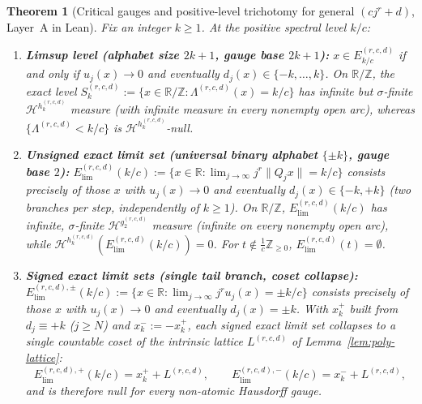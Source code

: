 \documentclass[11pt]{article}
\newtheorem{theorem}{Theorem}
\theoremstyle{definition}
\theoremstyle{remark}
\newcommand{\R}{\mathbb{R}}
\newcommand{\Z}{\mathbb{Z}}
\newcommand{\Lam}{\Lambda}
\begin{document}
\begin{theorem}[Critical gauges and positive-level trichotomy for general $(cj^r+d)$, Layer~A in Lean]\label{thm:poly-gauge-trichotomy}
Fix an integer $k\ge1$. At the positive spectral level $k/c$:
\begin{enumerate}[label=(\roman*),leftmargin=2em]
\item \textbf{Limsup level (alphabet size $2k+1$, gauge base $2k+1$):}
$x\in E_{k/c}^{(r,c,d)}$ if and only if $u_j(x)\to0$ and eventually
$d_j(x)\in\{-k,\dots,k\}$. On $\R/\Z$, the exact level
$S_k^{(r,c,d)}:=\{x\in\R/\Z:\Lam^{(r,c,d)}(x)=k/c\}$ has infinite but
$\sigma$-finite $\mathcal H^{h_k^{(r,c,d)}}$ measure (with infinite measure in
every nonempty open arc), whereas $\{\Lam^{(r,c,d)}<k/c\}$ is
$\mathcal H^{h_k^{(r,c,d)}}$-null.
\item \textbf{Unsigned exact limit set (universal binary alphabet $\{\pm k\}$, gauge base $2$):}
$E_{\mathrm{lim}}^{(r,c,d)}(k/c):=\{x\in\R:\lim_{j\to\infty}j^r\|Q_jx\|=k/c\}$
consists precisely of those $x$ with $u_j(x)\to0$ and eventually
$d_j(x)\in\{-k,+k\}$ (two branches per step, independently of $k\ge1$). On
$\R/\Z$, $E_{\mathrm{lim}}^{(r,c,d)}(k/c)$ has infinite, $\sigma$-finite
$\mathcal H^{g_2^{(r,c,d)}}$ measure (infinite on every nonempty open arc),
while $\mathcal H^{h_k^{(r,c,d)}}(E_{\mathrm{lim}}^{(r,c,d)}(k/c))=0$. For
$t\notin\frac1c\Z_{\ge0}$, $E_{\mathrm{lim}}^{(r,c,d)}(t)=\emptyset$.
\item \textbf{Signed exact limit sets (single tail branch, coset collapse):}
$E_{\mathrm{lim}}^{(r,c,d),\pm}(k/c):=\{x\in\R:\lim_{j\to\infty}j^ru_j(x)=\pm k/c\}$
consists precisely of those $x$ with $u_j(x)\to0$ and eventually $d_j(x)=\pm k$.
With $x_k^+$ built from $d_j\equiv+k$ ($j\ge N$) and $x_k^-:=-x_k^+$, each signed
exact limit set collapses to a single countable coset of the intrinsic lattice
$L^{(r,c,d)}$ of Lemma~\ref{lem:poly-lattice}:
\[
E_{\mathrm{lim}}^{(r,c,d),+}(k/c)=x_k^+ + L^{(r,c,d)},\qquad
E_{\mathrm{lim}}^{(r,c,d),-}(k/c)=x_k^- + L^{(r,c,d)},
\]
and is therefore null for every non-atomic Hausdorff gauge.
\end{enumerate}
\end{theorem}
\end{document}
